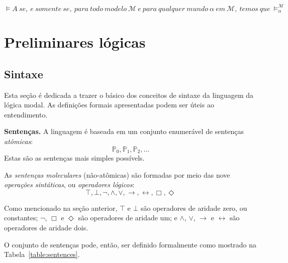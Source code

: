 \begin{equation}
    \models A\ se,\ e\ somente\ se,\ para\ todo\ modelo\ \mathcal{M}\ e\ para\ 
    qualquer\ mundo\ \alpha\ em\ \mathcal{M},\ temos\ que\ \models ^{\mathcal{M}}_\alpha 
\end{equation}



\section{Preliminares lógicas}
\subsection{Sintaxe}

Esta seção é dedicada a trazer o básico dos conceitos de sintaxe da linguagem da
lógica modal. As definições formais apresentadas podem ser úteis ao
entendimento.

\textbf{Sentenças.} A linguagem é baseada em um conjunto enumerável de sentenças
\textit{at\^omicas}: 
\begin{equation}
    \mathbb{P}_0, \mathbb{P}_1, \mathbb{P}_2, \ldots 
\end{equation}
Estas são as sentenças mais simples possívels.

As \textit{sentenças moleculares} (não-at\^omicas) são formadas por meio das nove
\textit{operações sintáticas}, ou \textit{operadores lógicos}:
\begin{equation}
   \top, \bot, \neg, \wedge, \vee, \rightarrow, \leftrightarrow, \Box, \Diamond
\end{equation}

Como mencionado na seção anterior, $\top$ e $\bot$ são operadores de aridade
zero, ou constantes; $\neg$, $\Box$ e $\Diamond$ são operadores de aridade um; e
$\wedge$, $\vee$, $\rightarrow$ e $\leftrightarrow$ são operadores de aridade
dois.

O conjunto de sentenças pode, então, ser definido formalmente como mostrado na
Tabela~\ref{table:sentences}.


